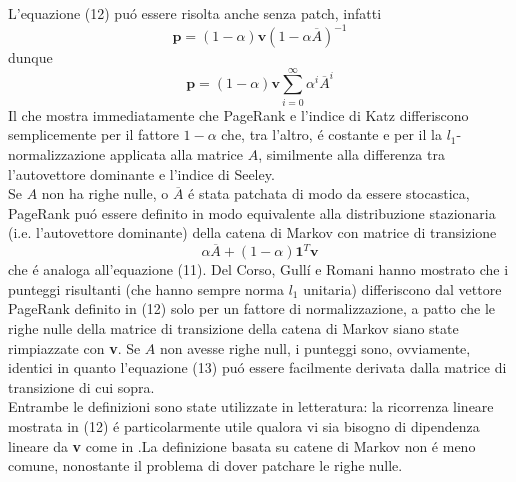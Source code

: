 L'equazione (12) puó essere risolta anche senza patch, infatti
\begin{equation}
    \textbf{p} = (1 - \alpha)\textbf{v}(1 - \alpha\overline{A})^{-1}
\end{equation}
dunque
\begin{equation*}
    \textbf{p} = (1 - \alpha)\textbf{v}\sum_{i = 0}^{\infty}{\alpha^i\overline{A}^i}
\end{equation*}
Il che mostra immediatamente che PageRank e l'indice di Katz differiscono semplicemente per il fattore $1 - \alpha$ che, tra l'altro, é costante e per il la $l_1$-normalizzazione applicata alla matrice $A$, similmente alla differenza tra l'autovettore dominante e l'indice di Seeley.\\
Se $A$ non ha righe nulle, o $\overline{A}$ é stata patchata di modo da essere stocastica, PageRank puó essere definito in modo equivalente alla distribuzione stazionaria (i.e. l'autovettore dominante) della catena di Markov con matrice di transizione
\begin{equation*}
    \alpha\overline{A} + (1 - \alpha)\textbf{1}^T\textbf{v}
\end{equation*}
che é analoga all'equazione (11). Del Corso, Gullí e Romani %
hanno mostrato che i punteggi risultanti (che hanno sempre norma $l_1$ unitaria) differiscono dal vettore PageRank definito in (12) solo per un fattore di normalizzazione, a patto che le righe nulle della matrice di transizione della catena di Markov siano state rimpiazzate con \textbf{v}. Se $A$ non avesse righe null, i punteggi sono, ovviamente, identici in quanto l'equazione (13) puó essere facilmente derivata dalla matrice di transizione di cui sopra.\\
Entrambe le definizioni sono state utilizzate in letteratura: la ricorrenza lineare mostrata in (12) é particolarmente utile qualora vi sia bisogno di dipendenza lineare da \textbf{v} come in %
.La definizione basata su catene di Markov non é meno comune, nonostante il problema di dover patchare le righe nulle.